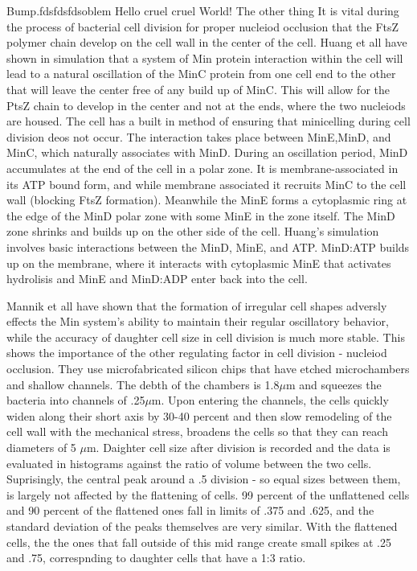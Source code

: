 \documentclass[pdftex,10pt,a4paper]{article}
\begin{document}


Bump.fdsfdsfdsoblem  Hello cruel cruel World!  The other thing
It is vital during the process of bacterial cell division for proper nucleiod occlusion that the FtsZ polymer chain develop on the cell wall in the center of the cell.  Huang et all have shown in simulation that a system of Min protein interaction within the cell will lead to a natural oscillation of the MinC protein from one cell end to the other that will leave the center free of any build up of MinC.  This will allow for the PtsZ chain to develop in the center and not at the ends, where the two nucleiods are housed.  The cell has a built in method of ensuring that minicelling during cell division deos not occur.  The interaction takes place between MinE,MinD, and MinC, which naturally associates with MinD.  During an oscillation period, MinD accumulates at the end of the cell in a polar zone.  It is membrane-associated in its ATP bound form, and while membrane associated it recruits MinC to the cell wall (blocking FtsZ formation).  Meanwhile the MinE forms a cytoplasmic ring at the edge of the MinD polar zone with some MinE in the zone itself.  The MinD zone shrinks and builds up on the other side of the cell.  Huang's simulation involves basic interactions between the MinD, MinE, and ATP.  MinD:ATP builds up on the membrane, where it interacts with cytoplasmic MinE that activates hydrolisis and MinE and MinD:ADP enter back into the cell.

Mannik et all have shown that the formation of irregular cell shapes adversly effects the Min system's ability to maintain their regular oscillatory behavior, while the accuracy of daughter cell size in cell division is much more stable.  This shows the importance of the other regulating factor in cell division - nucleiod occlusion.  They use microfabricated silicon chips that have etched microchambers and shallow channels.  The debth of the chambers is 1.8$\mu$m and squeezes the bacteria into channels of .25$\mu$m.  Upon entering the channels, the cells quickly widen along their short axis by 30-40 percent and then slow remodeling of the cell wall with the mechanical stress, broadens the cells so that they can reach diameters of 5 $\mu$m.  Daighter cell size after division is recorded and the data is evaluated in histograms against the ratio of volume between the two cells.  Suprisingly, the central peak around a .5 division - so equal sizes between them, is largely not affected by the flattening of cells.  99 percent of the unflattened cells and 90 percent of the flattened ones fall in limits of .375 and .625, and the standard deviation of the peaks themselves are very similar.  With the flattened cells, the the ones that fall outside of this mid range create small spikes at .25 and .75, correspnding to daughter cells that have a 1:3 ratio.
\end{document}

